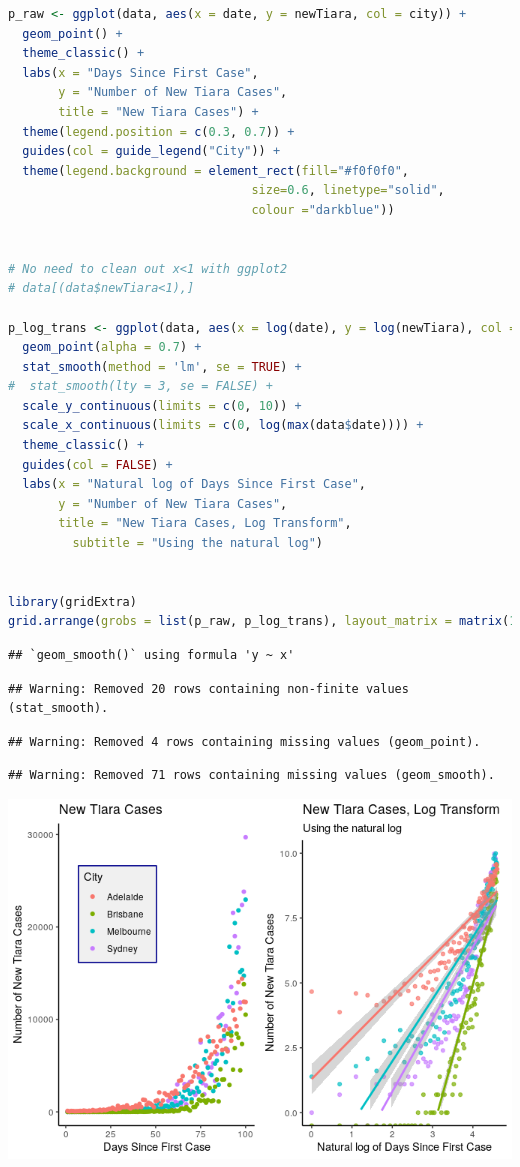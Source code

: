 \documentclass{article}
\begin{document}
\begin{lstlisting}[language=R]
p_raw <- ggplot(data, aes(x = date, y = newTiara, col = city)) +
  geom_point() +
  theme_classic() +
  labs(x = "Days Since First Case",
       y = "Number of New Tiara Cases",
       title = "New Tiara Cases") +
  theme(legend.position = c(0.3, 0.7)) +
  guides(col = guide_legend("City")) +
  theme(legend.background = element_rect(fill="#f0f0f0",
                                  size=0.6, linetype="solid",
                                  colour ="darkblue"))


# No need to clean out x<1 with ggplot2
# data[(data$newTiara<1),]

p_log_trans <- ggplot(data, aes(x = log(date), y = log(newTiara), col = city)) +
  geom_point(alpha = 0.7) +
  stat_smooth(method = 'lm', se = TRUE) +
#  stat_smooth(lty = 3, se = FALSE) +
  scale_y_continuous(limits = c(0, 10)) +
  scale_x_continuous(limits = c(0, log(max(data$date)))) +
  theme_classic() +
  guides(col = FALSE) +
  labs(x = "Natural log of Days Since First Case",
       y = "Number of New Tiara Cases",
       title = "New Tiara Cases, Log Transform",
         subtitle = "Using the natural log")


library(gridExtra)
grid.arrange(grobs = list(p_raw, p_log_trans), layout_matrix = matrix(1:2, nrow = 1))
\end{lstlisting}

\begin{lstlisting}
## `geom_smooth()` using formula 'y ~ x'
\end{lstlisting}

\begin{lstlisting}
## Warning: Removed 20 rows containing non-finite values (stat_smooth).
\end{lstlisting}

\begin{lstlisting}
## Warning: Removed 4 rows containing missing values (geom_point).
\end{lstlisting}

\begin{lstlisting}
## Warning: Removed 71 rows containing missing values (geom_smooth).
\end{lstlisting}

\includegraphics{main_files/figure-html/unnamed-chunk-15-1.png}
\end{document}
